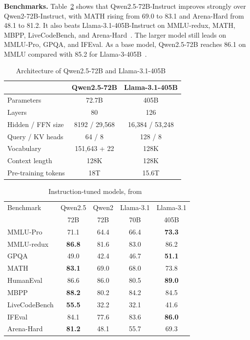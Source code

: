 \documentclass[conference]{IEEEtran}
\begin{document}
\textbf{Benchmarks.} Table~\ref{tab:bench} shows that Qwen2.5-72B-Instruct improves strongly over Qwen2-72B-Instruct, with MATH rising from 69.0 to 83.1 and Arena-Hard from 48.1 to 81.2. It also beats Llama-3.1-405B-Instruct on MMLU-redux, MATH, MBPP, LiveCodeBench, and Arena-Hard~\cite{qwen25}. The larger model still leads on MMLU-Pro, GPQA, and IFEval. As a base model, Qwen2.5-72B reaches 86.1 on MMLU compared with 85.2 for Llama-3-405B~\cite{qwen25}.

\begin{table}[t]
\centering
\caption{Architecture of Qwen2.5-72B and Llama-3.1-405B~\cite{qwen25,qwen2,qwen25card,llama3}}
\label{tab:spec}
\begin{tabular}{lcc}
\toprule
 & Qwen2.5-72B & Llama-3.1-405B \\
\midrule
Parameters & 72.7B & 405B \\
Layers & 80 & 126 \\
Hidden / FFN size & 8192 / 29{,}568 & 16{,}384 / 53{,}248 \\
Query / KV heads & 64 / 8 & 128 / 8 \\
Vocabulary & 151{,}643 + 22 & 128K \\
Context length & 128K & 128K \\
Pre-training tokens & 18T & 15.6T \\
\bottomrule
\end{tabular}
\end{table}

\begin{table}[t]
\centering
\caption{Instruction-tuned models, from~\cite[Table~6]{qwen25}}
\label{tab:bench}
\setlength{\tabcolsep}{5pt}
\begin{tabular}{lcccc}
\toprule
Benchmark & Qwen2.5 & Qwen2 & Llama-3.1 & Llama-3.1 \\
 & 72B & 72B & 70B & 405B \\
\midrule
MMLU-Pro & 71.1 & 64.4 & 66.4 & \textbf{73.3} \\
MMLU-redux & \textbf{86.8} & 81.6 & 83.0 & 86.2 \\
GPQA & 49.0 & 42.4 & 46.7 & \textbf{51.1} \\
MATH & \textbf{83.1} & 69.0 & 68.0 & 73.8 \\
HumanEval & 86.6 & 86.0 & 80.5 & \textbf{89.0} \\
MBPP & \textbf{88.2} & 80.2 & 84.2 & 84.5 \\
LiveCodeBench & \textbf{55.5} & 32.2 & 32.1 & 41.6 \\
IFEval & 84.1 & 77.6 & 83.6 & \textbf{86.0} \\
Arena-Hard & \textbf{81.2} & 48.1 & 55.7 & 69.3 \\
\bottomrule
\end{tabular}
\end{table}
\end{document}
